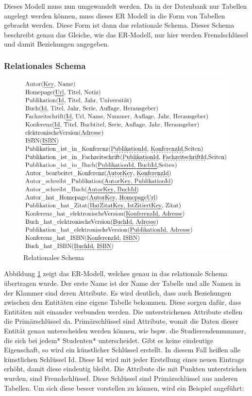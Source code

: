Dieses Modell muss nun umgewandelt werden. Da in der Datenbank nur Tabellen angelegt werden können, muss dieses ER Modell in die Form von Tabellen gebracht werden. Diese Form ist dann das relationale Schema. Dieses Schema beschreibt genau das Gleiche, wie das ER-Modell, nur hier werden Fremdschlüssel und damit Beziehungen angegeben.


\subsubsection{Relationales Schema}

\begin{figure}[!htb]
	\centering
	\includegraphics[width=12cm,keepaspectratio]{bilder/relationalesSchema}
	\caption{Relationales Schema}
	\label{fig:relationalesSchema}
\end{figure}


Abbildung \ref{fig:relationalesSchema} zeigt das ER-Modell, welches genau in das relationale Schema übertragen wurde. Der erste Name ist der Name der Tabelle und alle Namen in der Klammer sind deren Attribute. Es wird deutlich, dass auch Beziehungen zwischen den Entitäten eine eigene Tabelle bekommen. Diese sorgen dafür, dass Entitäten mit einander verbunden werden. Die unterstrichenen Attribute stellen die Primärschlüssel da. Primärschlüssel sind Attribute, womit die Daten dieser Entität genau unterscheiden werden können, wie bspw. die Studierendennummer, die sich bei jedem* Studenten* unterscheidet. Gibt es keine eindeutige Eigenschaft, so wird ein künstlicher Schlüssel erstellt. In diesem Fall heißen alle künstlichen
Schlüssel Id. Diese Id wird mit jeder Erstellung eines neuen Eintrags erhöht, damit
diese eindeutig bleibt. Die Attribute die mit Punkten unterstrichen wurden, sind Fremdschlüssel. Diese Schlüssel sind Primärschlüssel aus anderen Tabellen.
Um sich diese besser vorstellen zu können, wird ein Beispiel angeführt:

